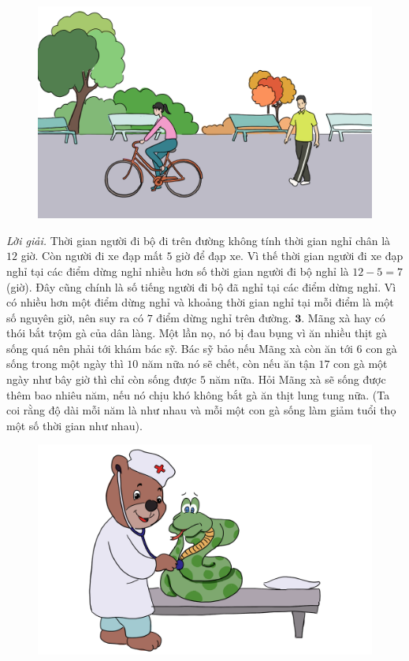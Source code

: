 \begin{multicols}{2}
	\begin{figure}[H]
		\vspace*{-8pt}
		\centering
		\captionsetup{labelformat= empty, justification=centering}
		\includegraphics[width= 1\linewidth]{bai2}
		\vspace*{-15pt}
	\end{figure}
	\textit{Lời giải.} Thời gian người đi bộ đi trên đường không tính thời gian nghỉ chân là $12$ giờ. Còn người đi xe đạp mất $5$ giờ để đạp xe. Vì thế thời gian người đi xe đạp nghỉ tại các điểm dừng nghỉ nhiều hơn số thời gian người đi bộ nghỉ là $12-5 = 7$ (giờ). Đây cũng chính là số tiếng người đi bộ đã nghỉ tại các điểm dừng nghỉ. Vì có nhiều hơn một điểm dừng nghỉ và khoảng thời gian nghỉ tại mỗi điểm là một số nguyên giờ, nên suy ra có $7$ điểm dừng nghỉ trên đường.
	\vskip 0.1cm
	$\pmb{3.}$ Mãng xà hay có thói bắt trộm gà của dân làng. Một lần nọ, nó bị đau bụng vì ăn nhiều thịt gà sống quá nên phải tới khám bác sỹ. Bác sỹ bảo nếu Mãng xà còn ăn tới $6$ con gà sống trong một ngày thì $10$ năm nữa nó sẽ chết, còn nếu ăn tận $17$ con gà một ngày như bây giờ thì chỉ còn sống được $5$ năm nữa. Hỏi Mãng xà sẽ sống được thêm bao nhiêu năm, nếu nó chịu khó không bắt gà ăn thịt lung tung nữa. (Ta coi rằng độ dài mỗi năm là như nhau và mỗi một con gà sống làm giảm tuổi thọ một số thời gian như nhau).
	\begin{figure}[H]
		\vspace*{-8pt}
		\centering
		\captionsetup{labelformat= empty, justification=centering}
		\includegraphics[width= 0.9\linewidth]{bai3}

\end{figure}
\end{multicols}
